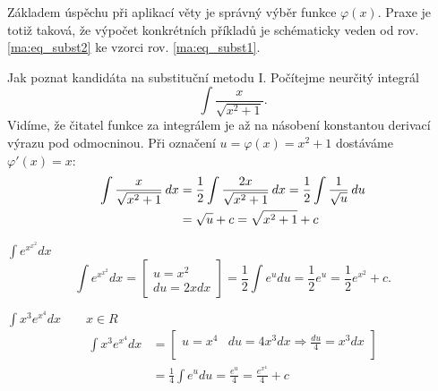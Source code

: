 {      Základem úspěchu při aplikací věty je správný výběr funkce $\varphi(x)$. Praxe je totiž
      taková, že výpočet konkrétních příkladů je schématicky veden od rov. \ref{ma:eq_subst2} ke
      vzorci rov. \ref{ma:eq_subst1}.
      
      \begin{example} Jak poznat kandidáta na substituční metodu I.\newline
        Počítejme neurčitý integrál \[\int \frac{x}{\sqrt{x^2+1}}.\]
        Vidíme, že čitatel funkce za integrálem je až na násobení konstantou derivací výrazu pod 
        odmocninou. Při označení \(u=\varphi(x) = x^2 + 1\) dostáváme \(\varphi'(x) = x\):
        \begin{align*}
          \int\frac{x}{\sqrt{x^2+1}}\hspace{2pt}dx 
            &= \frac{1}{2}\int\frac{2x}{\sqrt{x^2+1}}\hspace{2pt}dx 
             = \frac{1}{2}\int\frac{1}{\sqrt{u}}\hspace{2pt}du         \\
            &= \sqrt{u} + c = \sqrt{x^2 + 1} + c  
        \end{align*}
      \end{example}
      
      \begin{example}\label{ma:ex_sub_metoda}$\displaystyle\int{e^{x^{x^2}}dx}$
        \begin{equation*}
            \int{e^{x^{x^2}}dx}=
               \left[
                 \begin{array}{c}u=x^2 \\ du=2xdx\end{array}
               \right]=
               \frac{1}{2}\int{e^udu}=\frac{1}{2}e^u=\frac{1}{2}e^{x^2} + c.
        \end{equation*}
      \end{example}
      
      \begin{example}$\displaystyle\int{x^3e^{x^4}}dx \qquad x\in R$
        \begin{align*}
          \displaystyle\int{x^3e^{x^4}}dx
             &= 
             \left[
               \begin{array}{cc}
                  u=x^4   & du=4x^3dx \Rightarrow \displaystyle\frac{du}{4} = x^3dx  \\
               \end{array}
             \right]                                                                           \\
             &= \frac{1}{4}\int{e^u}du = \frac{e^u}{4} = \frac{e^{x^4}}{4} + c 
        \end{align*}
      \end{example}

}
